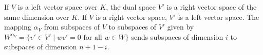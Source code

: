 If $V$ is a left vector space over $K$, the dual space $V'$ is a right vector space of the same dimension over $K$. If $V$ is a right vector space, $V'$ is a left vector space. The mapping $\alpha_V$ from subspaces of $V$ to subspaces of $V'$ given by $W^{\alpha_V} = \{v' \in V' \mid wv' = 0 \text{ for all } w \in W\}$ sends subspaces of dimension $i$ to subspaces of dimension $n+1-i$.
